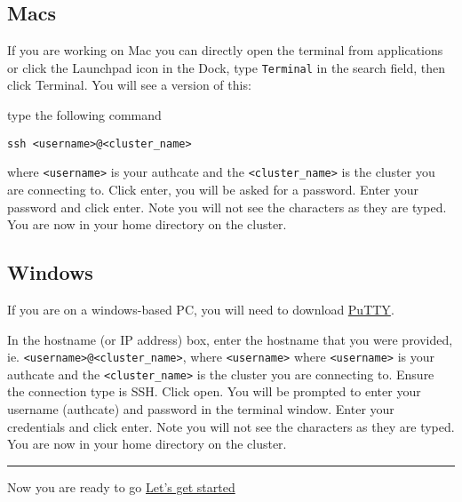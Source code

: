 \documentclass[
]{book}
\begin{document}
\hypertarget{macs}{%
\subsection{Macs}\label{macs}}

If you are working on Mac you can directly open the terminal from applications or click the Launchpad icon in the Dock, type \texttt{Terminal} in the search field, then click Terminal. You will see a version of this:

type the following command

\begin{verbatim}
ssh <username>@<cluster_name>
\end{verbatim}

where \texttt{\textless{}username\textgreater{}} is your authcate and the \texttt{\textless{}cluster\_name\textgreater{}} is the cluster you are connecting to. Click enter, you will be asked for a password. Enter your password and click enter. Note you will not see the characters as they are typed. You are now in your home directory on the cluster.

\hypertarget{windows}{%
\subsection{Windows}\label{windows}}

If you are on a windows-based PC, you will need to download \href{https://www.putty.org/}{PuTTY}.

In the hostname (or IP address) box, enter the hostname that you were provided, ie. \texttt{\textless{}username\textgreater{}@\textless{}cluster\_name\textgreater{}}, where \texttt{\textless{}username\textgreater{}} where \texttt{\textless{}username\textgreater{}} is your authcate and the \texttt{\textless{}cluster\_name\textgreater{}} is the cluster you are connecting to. Ensure the connection type is SSH. Click open. You will be prompted to enter your username (authcate) and password in the terminal window. Enter your credentials and click enter. Note you will not see the characters as they are typed. You are now in your home directory on the cluster.

\begin{center}\rule{0.5\linewidth}{0.5pt}\end{center}

Now you are ready to go
{\href{introduction.html}{Let's get started}}
\end{document}
